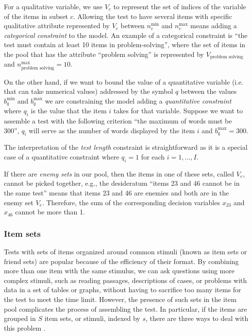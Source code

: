 For a qualitative variable, we use $V_c$ to represent the set of indices of the variable of the items in subset $c$.
Allowing the test to have several items with specific qualitative attribute represented by $V_c$ between $n^{\min}_{c}$ and $n^{\max}_{c}$ means adding a \emph{categorical constraint} to the model.
An example of a categorical constraint is ``the test must contain at least 10 items in problem-solving'', where the set of items in the pool that has the attribute ``problem solving'' is represented by $V_\text{problem solving}$ and $n^{\max}_\text{problem solving}=10$.

On the other hand, if we want to bound the value of a quantitative variable (i.e. that can take numerical values) addressed by the symbol $q$ between the values $b^{\min}_{q}$ and $b^{\max}_{q}$ we are constraining the model adding a \emph{quantitative constraint} where $q_i$ is the value that the item $i$ takes for that variable.
Suppose we want to assemble a test with the following criterion ``the maximum of words must be 300'', $q_i$ will serve as the number of words displayed by the item $i$ and $b^{\max}_{q}=300$.

The interpretation of the \textit{test length} constraint is straightforward as it is a special case of a quantitative constraint where $q_i=1$ for each $i=1,\ldots,I$.

If there are \textit{enemy sets} in our pool, then the items in one of these sets, called $V_e$, cannot be picked together, e.g., the desideratum ``items 23 and 46 cannot be in the same test'' means that items 23 and 46 are enemies and both are in the enemy set $V_e$.
Therefore, the sum of the corresponding decision variables $x_{23}$ and $x_{46}$ cannot be more than 1.

\subsubsection{Item sets}\label{sec:item-sets}

Tests with sets of items organized around common stimuli (known as item sets or friend sets) are popular because of the efficiency of their format.
By combining more than one item with the same stimulus, we can ask questions using more complex stimuli, such as reading passages, descriptions of cases, or problems with data in a set of tables or graphs, without having to sacrifice too many items for the test to meet the time limit.
However, the presence of such sets in the item pool complicates the process of assembling the test.
In particular, if the items are grouped in $S$ item sets, or stimuli, indexed by $s$, there are three ways to deal with this problem \parencite[see][]{VDL2005}.

